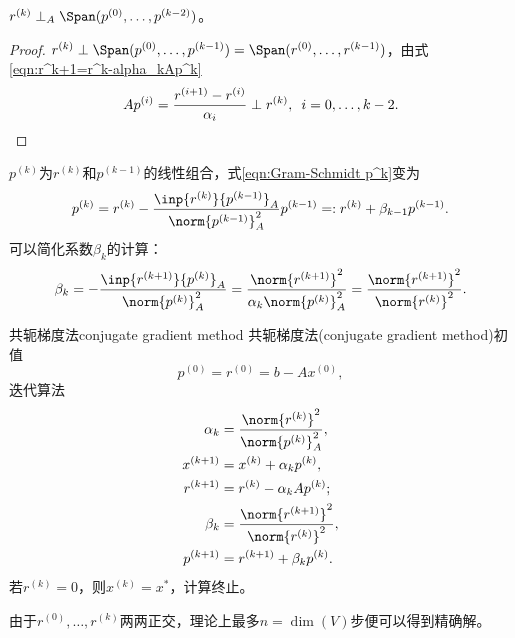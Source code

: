 \begin{theorem}
    {}{}
    $r^{(k)}\perp_A\Span(p^{(0)},\ldots,p^{(k-2)})$。
\end{theorem}

\begin{proof}
    $r^{(k)}\perp\Span(p^{(0)},\ldots,p^{(k-1)})=\Span(r^{(0)},\ldots,r^{(k-1)})$，由式\eqref{eqn:r^k+1=r^k-alpha_kAp^k}
    \[
        Ap^{(i)}=\frac{r^{(i+1)}-r^{(i)}}{\alpha_i}\perp r^{(k)},\enspace i=0,\ldots,k-2.
        \qedhere
    \]
\end{proof}

\begin{corollary}
    $p^{(k)}$为$r^{(k)}$和$p^{(k-1)}$的线性组合，式\eqref{eqn:Gram-Schmidt p^k}变为
    \[
        p^{(k)}=r^{(k)}-\frac{\inp{r^{(k)}}{p^{(k-1)}}_A}{\norm{p^{(k-1)}}_A^2}p^{(k-1)}=:r^{(k)}+\beta_{k-1}p^{(k-1)}.
    \]
    可以简化系数$\beta_k$的计算：
    \[
        \beta_k=-\frac{\inp{r^{(k+1)}}{p^{(k)}}_A}{\norm{p^{(k)}}_A^2}=\frac{\norm{r^{(k+1)}}^2}{\alpha_k\norm{p^{(k)}}_A^2}=\frac{\norm{r^{(k+1)}}^2}{\norm{r^{(k)}}^2}.
    \]
\end{corollary}

\begin{theorem}
    {共轭梯度法}{conjugate gradient method}
    共轭梯度法(conjugate gradient method)初值
    \begin{equation}
        p^{(0)}=r^{(0)}=b-Ax^{(0)},
    \end{equation}
    迭代算法
    \begin{subequations}
        \begin{align}
            \alpha_k&=\frac{\norm{r^{(k)}}^2}{\norm{p^{(k)}}_A^2},\\
            x^{(k+1)}&=x^{(k)}+\alpha_kp^{(k)},\\
            r^{(k+1)}&=r^{(k)}-\alpha_kAp^{(k)};\\
            \beta_k&=\frac{\norm{r^{(k+1)}}^2}{\norm{r^{(k)}}^2},\\
            p^{(k+1)}&=r^{(k+1)}+\beta_kp^{(k)}.
        \end{align}
    \end{subequations}
    若$r^{(k)}=0$，则$x^{(k)}=x^*$，计算终止。
\end{theorem}

\begin{corollary}
    由于$r^{(0)},\ldots,r^{(k)}$两两正交，理论上最多$n=\dim(V)$步便可以得到精确解。
\end{corollary}

